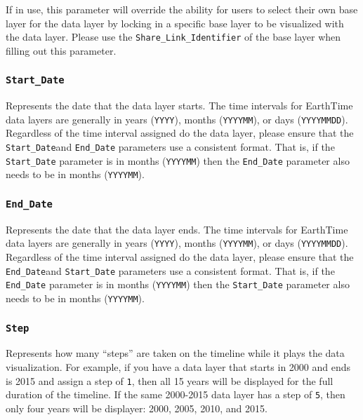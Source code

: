 \documentclass[
  12pt,
]{krantz}
\begin{document}
If in use, this parameter will override the ability for users to select their own base layer for the data layer by locking in a specific base layer to be visualized with the data layer. Please use the \texttt{Share\_Link\_Identifier} of the base layer when filling out this parameter.

\hypertarget{start_date}{%
\subsubsection*{\texorpdfstring{\texttt{Start\_Date}}{Start\_Date}}\label{start_date}}


Represents the date that the data layer starts. The time intervals for EarthTime data layers are generally in years (\texttt{YYYY}), months (\texttt{YYYYMM}), or days (\texttt{YYYYMMDD}). Regardless of the time interval assigned do the data layer, please ensure that the \texttt{Start\_Date}and \texttt{End\_Date} parameters use a consistent format. That is, if the \texttt{Start\_Date} parameter is in months (\texttt{YYYYMM}) then the \texttt{End\_Date} parameter also needs to be in months (\texttt{YYYYMM}).

\hypertarget{end_date}{%
\subsubsection*{\texorpdfstring{\texttt{End\_Date}}{End\_Date}}\label{end_date}}


Represents the date that the data layer ends. The time intervals for EarthTime data layers are generally in years (\texttt{YYYY}), months (\texttt{YYYYMM}), or days (\texttt{YYYYMMDD}). Regardless of the time interval assigned do the data layer, please ensure that the \texttt{End\_Date}and \texttt{Start\_Date} parameters use a consistent format. That is, if the \texttt{End\_Date} parameter is in months (\texttt{YYYYMM}) then the \texttt{Start\_Date} parameter also needs to be in months (\texttt{YYYYMM}).

\hypertarget{step}{%
\subsubsection*{\texorpdfstring{\texttt{Step}}{Step}}\label{step}}


Represents how many ``steps'' are taken on the timeline while it plays the data visualization. For example, if you have a data layer that starts in 2000 and ends is 2015 and assign a step of \texttt{1}, then all 15 years will be displayed for the full duration of the timeline. If the same 2000-2015 data layer has a step of \texttt{5}, then only four years will be displayer: 2000, 2005, 2010, and 2015.
\end{document}
